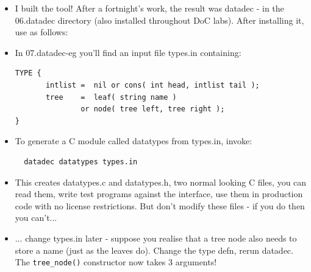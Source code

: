 \documentclass[aspectratio=169]{beamer}
\newcommand{\pitem}{\pause \item}
\begin{document}
\begin{frame}[fragile]
    \begin{itemize}
    \item
      I built the tool!  After a fortnight's work, the
      result was \alert{datadec} - in the \alert{06.datadec} directory
      (also installed throughout DoC labs).
      After installing it, use as follows:
    \pitem
      In \alert{07.datadec-eg} you'll find an input file
      \alert{types.in} containing:
      \small
\begin{verbatim}
TYPE {
       intlist =  nil or cons( int head, intlist tail );
       tree    =  leaf( string name )
               or node( tree left, tree right );
}
\end{verbatim}
    \pitem
       To generate a C module called \alert{datatypes} from \alert{types.in},
       invoke:
\begin{verbatim}
  datadec datatypes types.in
\end{verbatim}
    \pitem
       This creates \alert{datatypes.c} and \alert{datatypes.h}, two
       normal looking C files,
       you can read them, write test programs against the interface,
       use them in production code with no license restrictions.
       \pause
       But don't modify these files - if you do then you can't...
    \pitem
       ... change \alert{types.in} later - suppose you realise that
       a tree node also needs to store a name (just as the leaves do).
       Change the type defn, rerun \alert{datadec}.  The \verb+tree_node()+
       constructor now takes 3 arguments!
    \end{itemize}
\end{frame}
\end{document}
